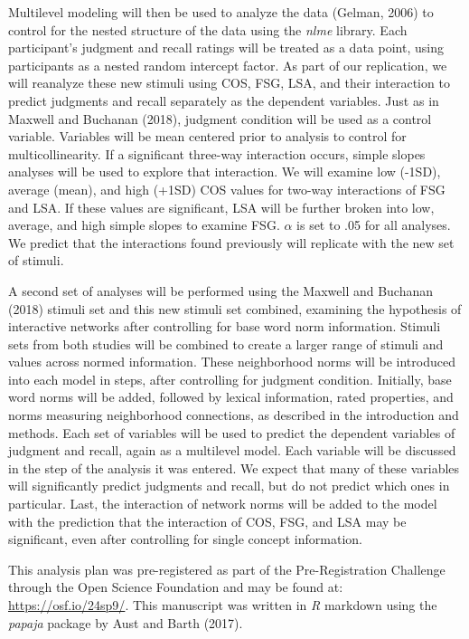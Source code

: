\documentclass[english,man]{apa6}
\theoremstyle{definition}
\theoremstyle{definition}
\theoremstyle{definition}
\theoremstyle{remark}
\begin{document}
Multilevel modeling will then be used to analyze the data (Gelman, 2006)
to control for the nested structure of the data using the \emph{nlme}
library. Each participant's judgment and recall ratings will be treated
as a data point, using participants as a nested random intercept factor.
As part of our replication, we will reanalyze these new stimuli using
COS, FSG, LSA, and their interaction to predict judgments and recall
separately as the dependent variables. Just as in Maxwell and Buchanan
(2018), judgment condition will be used as a control variable. Variables
will be mean centered prior to analysis to control for
multicollinearity. If a significant three-way interaction occurs, simple
slopes analyses will be used to explore that interaction. We will
examine low (-1SD), average (mean), and high (+1SD) COS values for
two-way interactions of FSG and LSA. If these values are significant,
LSA will be further broken into low, average, and high simple slopes to
examine FSG. \(\alpha\) is set to .05 for all analyses. We predict that
the interactions found previously will replicate with the new set of
stimuli.

A second set of analyses will be performed using the Maxwell and
Buchanan (2018) stimuli set and this new stimuli set combined, examining
the hypothesis of interactive networks after controlling for base word
norm information. Stimuli sets from both studies will be combined to
create a larger range of stimuli and values across normed information.
These neighborhood norms will be introduced into each model in steps,
after controlling for judgment condition. Initially, base word norms
will be added, followed by lexical information, rated properties, and
norms measuring neighborhood connections, as described in the
introduction and methods. Each set of variables will be used to predict
the dependent variables of judgment and recall, again as a multilevel
model. Each variable will be discussed in the step of the analysis it
was entered. We expect that many of these variables will significantly
predict judgments and recall, but do not predict which ones in
particular. Last, the interaction of network norms will be added to the
model with the prediction that the interaction of COS, FSG, and LSA may
be significant, even after controlling for single concept information.

This analysis plan was pre-registered as part of the Pre-Registration
Challenge through the Open Science Foundation and may be found at:
\url{https://osf.io/24sp9/}. This manuscript was written in \emph{R}
markdown using the \emph{papaja} package by Aust and Barth (2017).
\end{document}
